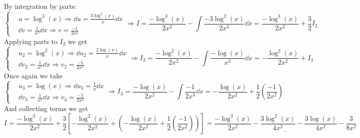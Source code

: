 \documentclass[12pt]{article}
\theoremstyle{plain}
\theoremstyle{definition}
\theoremstyle{remark}
\renewcommand{\:}{\colon}           %
\newcommand{\un}[1]{\underline{#1}}
\renewcommand{\.}{\Cdot}                %
\newcommand{\To}{\Rightarrow}
\begin{document}
          
          \begin{ptcb}
            By integration by parts:
            $$
            \left\lbrace
            \begin{aligned}
              &u=\log^3(x)\To\dd u=\frac{3\log^2(x)}{x}\dd x\\
              &\dd v=\frac{1}{x^3}\dd x\To v=\frac{-1}{2x^2}
            \end{aligned}
            \right.
            \To I=\frac{-\log^3(x)}{2x^2}-\int \frac{-3\log^2(x)}{2x^3}\dd x=\frac{-\log^3(x)}{2x^2}+\frac{3}{2}I_2
            $$
            Applying parts to $I_2$ we get
            $$
            \left\lbrace
            \begin{aligned}
              &u_2=\log^2(x)\To\dd u_2=\frac{2\log(x)}{x}\dd x\\
              &\dd v_2=\frac{1}{x^3}\dd x\To v_2=\frac{-1}{2x^2}
            \end{aligned}
            \right.
            \To I_2=\frac{-\log^2(x)}{2x^2}-\int \frac{-\log(x)}{x^3}\dd x=-\frac{\log^2(x)}{2x^2}+I_3
            $$
            Once again we take
            $$
            \left\lbrace
            \begin{aligned}
              &u_3=\log(x)\To\dd u_3=\frac{1}{x}\dd x\\
              &\dd v_3=\frac{1}{x^3}\dd x\To v_3=\frac{-1}{2x^2}
            \end{aligned}
            \right.
            \To I_3=\frac{-\log(x)}{2x^2}-\int \frac{-1}{2x^3}\dd x=-\frac{\log(x)}{2x^2}+\frac{1}{2}\left(\frac{-1}{2x^2}\right)
            $$
            And collecting terms we get
            $$I=\frac{-\log^3(x)}{2x^2}+\frac{3}{2}\left\lbrack-\frac{\log^2(x)}{2x^2}+\left(-\frac{\log(x)}{2x^2}+\frac{1}{2}\left(\frac{-1}{2x^2}\right)\right)\right\rbrack=\un{\frac{-\log^3(x)}{2x^2}-\frac{3\log^2(x)}{4x^2}-\frac{3\log(x)}{4x^2}-\frac{3}{8x^2}}$$
            \end{ptcb}

\end{document}
